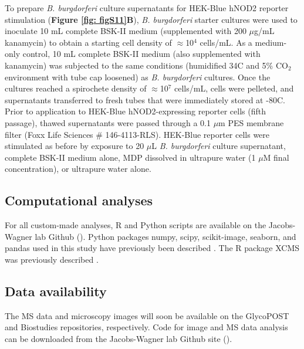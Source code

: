 \documentclass[twoside, watermark]{zHenriquesLab-StyleBioRxiv}
\newcommand{\tmu}{$\mu$} %
\newcommand{\COtwo}{CO$_\text{2}$} %
\begin{document}
\vspace{1mm}
To prepare \textit{B. burgdorferi} culture supernatants for HEK-Blue hNOD2 reporter stimulation (\textbf{Figure \ref{fig: figS11}B}), \textit{B. burgdorferi} starter cultures were used to inoculate 10 mL complete BSK-II medium (supplemented with 200 \tmu g/mL kanamycin) to obtain a starting cell density of $\approx$10$^\text{4}$ cells/mL. As a medium-only control, 10 mL complete BSK-II medium (also supplemented with kanamycin) was subjected to the same conditions (humidified 34\degree C and 5\% \COtwo environment with tube cap loosened) as \textit{B. burgdorferi} cultures. Once the cultures reached a spirochete density of $\approx$10$^\text{7}$ cells/mL, cells were pelleted, and supernatants transferred to fresh tubes that were immediately stored at -80\degree C. Prior to application to HEK-Blue hNOD2-expressing reporter cells (fifth passage), thawed supernatants were passed through a 0.1 \tmu m PES membrane filter (Foxx Life Sciences \# 146-4113-RLS). HEK-Blue reporter cells were stimulated as before by exposure to 20 \tmu L \textit{B. burgdorferi} culture supernatant, complete BSK-II medium alone, MDP dissolved in ultrapure water (1 \tmu M final concentration), or ultrapure water alone.

\subsection*{Computational analyses}
For all custom-made analyses, R and Python scripts are available on the Jacobs-Wagner lab Github (). Python packages numpy, scipy, scikit-image, seaborn, and pandas used in this study have previously been described \cite{Harris2020,McKinney2011,vanderWalt2014,Virtanen2020,Waskom2021}. The R package XCMS was previously described \cite{Smith2006}.

\subsection*{Data availability}
The MS data and microscopy images will soon be available on the GlycoPOST and Biostudies repositories, respectively. Code for image and MS data analysis can be downloaded from the Jacobs-Wagner lab Github site ().
\end{document}
